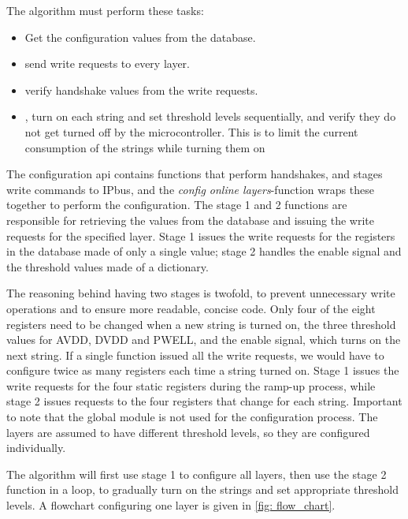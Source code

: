 \documentclass[main.tex]{subfiles}
\begin{document}
The algorithm must perform these tasks:

\begin{itemize}
    \item Get the configuration values from the database.
    \item send write requests to every layer.
    \item verify handshake values from the write requests.
    \item , turn on each string and set threshold levels sequentially, and verify they do not get turned off by the microcontroller. This is to limit the current consumption of the strings while turning them on
\end{itemize}

The configuration \gls{api} contains functions that perform handshakes, and stages write commands to IPbus, and the \textit{config online layers}-function wraps these together to perform the configuration. The stage 1 and 2 functions are responsible for retrieving the values from the database and issuing the write requests for the specified layer. Stage 1 issues the write requests for the registers in the database made of only a single value; stage 2 handles the enable signal and the threshold values made of a dictionary.

The reasoning behind having two stages is twofold, to prevent unnecessary write operations and to ensure more readable, concise code. Only four of the eight registers need to be changed when a new string is turned on, the three threshold values for AVDD, DVDD and PWELL, and the enable signal, which turns on the next string. If a single function issued all the write requests, we would have to configure twice as many registers each time a string turned on. Stage 1 issues the write requests for the four static registers during the ramp-up process, while stage 2 issues requests to the four registers that change for each string. Important to note that the global module is not used for the configuration process. The layers are assumed to have different threshold levels, so they are configured individually.

The algorithm will first use stage 1 to configure all layers, then use the stage 2 function in a loop, to gradually turn on the strings and set appropriate threshold levels. A flowchart configuring one layer is given in \autoref{fig: flow_chart}.
\end{document}
